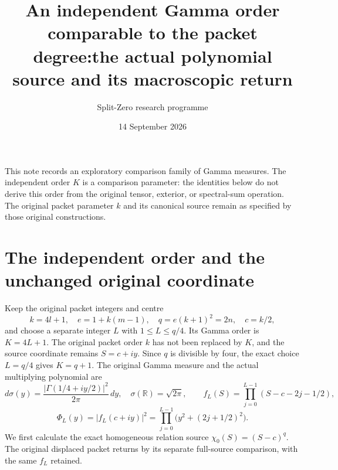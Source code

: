 \documentclass[11pt,a4paper]{article}
\title{An independent Gamma order comparable to the packet degree:\newline the actual polynomial source and its macroscopic return}
\author{Split-Zero research programme}
\date{14 September 2026}
\newcommand{\R}{\mathbb R}
\begin{document}
\maketitle

This note records an exploratory comparison family of Gamma measures.
The independent order $K$ is a comparison parameter: the identities below
do not derive this order from the original tensor, exterior, or spectral-sum
operation. The original packet parameter $k$ and its canonical source
remain as specified by those original constructions.

\section{The independent order and the unchanged original coordinate}

Keep the original packet integers and centre
\[
 k=4l+1,\quad e=1+k(m-1),\quad q=e(k+1)^2=2n,
 \quad c=k/2,
\]
and choose a separate integer $L$ with $1\le L\le q/4$. Its Gamma
order is $K=4L+1$. The original packet order $k$ has not been replaced
by $K$, and the source coordinate remains $S=c+iy$. Since $q$ is
divisible by four, the exact choice $L=q/4$ gives $K=q+1$.
The original Gamma measure and the actual multiplying polynomial are
\[
 d\sigma(y)=\frac{|\Gamma(1/4+iy/2)|^2}{2\pi}\,dy,
 \quad \sigma(\R)=\sqrt{2\pi},\qquad
 f_L(S)=\prod_{j=0}^{L-1}(S-c-2j-1/2),
 \tag{MFG1}
\]
\[
 \Phi_L(y)=|f_L(c+iy)|^2
          =\prod_{j=0}^{L-1}\big(y^2+(2j+1/2)^2\big).
 \tag{MFG2}
\]
We first calculate the exact homogeneous relation source
$\chi_0(S)=(S-c)^q$. The original displaced packet returns by its
separate full-source comparison, with the same $f_L$ retained.
\end{document}
